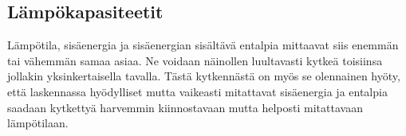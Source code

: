 \documentclass[12pt,a4paper,finnish]{book}
\begin{document}
% 
% 
% 
% 
% 

\subsection{Lämpökapasiteetit} %

Lämpötila, sisäenergia ja sisäenergian sisältävä entalpia mittaavat siis enemmän tai vähemmän samaa asiaa. Ne voidaan 
näinollen luultavasti kytkeä toisiinsa jollakin yksinkertaisella tavalla. Tästä kytkennästä on myös se olennainen hyöty, 
että laskennassa hyödylliset mutta vaikeasti mitattavat sisäenergia ja entalpia saadaan kytkettyä harvemmin kiinnostavaan 
mutta helposti mitattavaan lämpötilaan.
\end{document}
